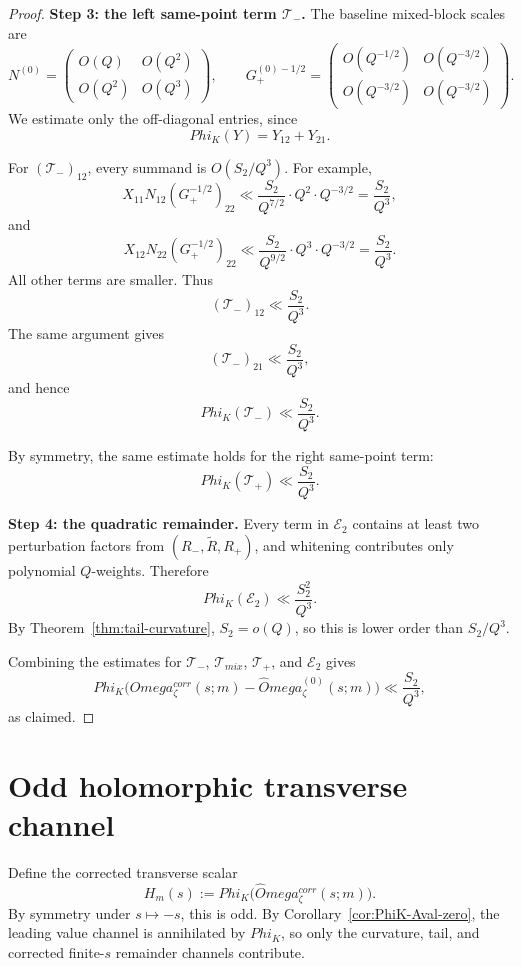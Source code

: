 \documentclass[11pt,a4paper]{amsart}
\def\Omega{Omega}%
\def\Phi{Phi}%
\def\corr{corr}%
\def\mix{mix}%
\theoremstyle{plain}
\theoremstyle{definition}
\newcommand{\corr}{\mathrm{corr}}
\newcommand{\mix}{\mathrm{mix}}
\begin{document}
\begin{proof}
\medskip
\noindent
\textbf{Step 3: the left same-point term $\mathcal T_-$.}
The baseline mixed-block scales are
\[
N^{(0)}=
\begin{pmatrix}
O(Q) & O(Q^2)\\
O(Q^2) & O(Q^3)
\end{pmatrix},
\qquad
G_+^{(0)-1/2}=
\begin{pmatrix}
O(Q^{-1/2}) & O(Q^{-3/2})\\
O(Q^{-3/2}) & O(Q^{-3/2})
\end{pmatrix}.
\]
We estimate only the off-diagonal entries, since
\[
\Phi_K(Y)=Y_{12}+Y_{21}.
\]

For $(\mathcal T_-)_{12}$, every summand is $O(S_2/Q^3)$. For example,
\[
X_{11}N_{12}(G_+^{-1/2})_{22}
\ll
\frac{S_2}{Q^{7/2}}\cdot Q^2\cdot Q^{-3/2}
=
\frac{S_2}{Q^3},
\]
and
\[
X_{12}N_{22}(G_+^{-1/2})_{22}
\ll
\frac{S_2}{Q^{9/2}}\cdot Q^3\cdot Q^{-3/2}
=
\frac{S_2}{Q^3}.
\]
All other terms are smaller. Thus
\[
(\mathcal T_-)_{12}\ll \frac{S_2}{Q^3}.
\]
The same argument gives
\[
(\mathcal T_-)_{21}\ll \frac{S_2}{Q^3},
\]
and hence
\[
\Phi_K(\mathcal T_-)\ll \frac{S_2}{Q^3}.
\]

By symmetry, the same estimate holds for the right same-point term:
\[
\Phi_K(\mathcal T_+)\ll \frac{S_2}{Q^3}.
\]

\medskip
\noindent
\textbf{Step 4: the quadratic remainder.}
Every term in $\mathcal E_2$ contains at least two perturbation factors from
$(R_-,\widetilde R,R_+)$, and whitening contributes only polynomial
$Q$-weights. Therefore
\[
\Phi_K(\mathcal E_2)\ll \frac{S_2^2}{Q^3}.
\]
By Theorem~\ref{thm:tail-curvature}, $S_2=o(Q)$, so this is lower order than
$S_2/Q^3$.

Combining the estimates for $\mathcal T_-$, $\mathcal T_{\mix}$,
$\mathcal T_+$, and $\mathcal E_2$ gives
\[
\Phi_K\!\bigl(\widehat\Omega_\zeta^{\corr}(s;m)-\widehat\Omega_\zeta^{(0)}(s;m)\bigr)
\ll
\frac{S_2}{Q^3},
\]
as claimed.
\end{proof}

\section{Odd holomorphic transverse channel}

Define the corrected transverse scalar
\begin{equation}\label{eq:Hm-def}
H_m(s):=\Phi_K\!\bigl(\widehat\Omega_\zeta^{\corr}(s;m)\bigr).
\end{equation}
By symmetry under $s\mapsto -s$, this is odd. By
Corollary~\ref{cor:PhiK-Aval-zero}, the leading value channel is
annihilated by $\Phi_K$, so only the curvature, tail, and corrected
finite-$s$ remainder channels contribute.
\end{document}
